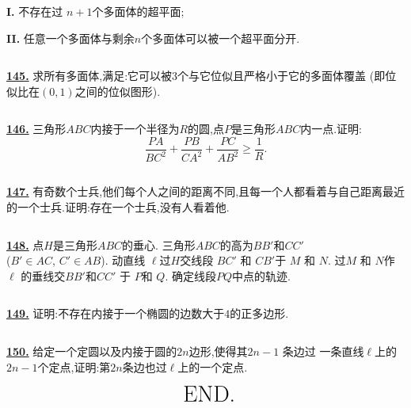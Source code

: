 \documentclass{article}
\newcommand{\plus}{+}
\begin{document}
{\bf I.} 不存在过  $n+1$个多面体的超平面;

{\bf II.} 任意一个多面体与剩余$n$个多面体可以被一个超平面分开.


$$ $$


\href{ http://www.artofproblemsolving.com/Forum/viewtopic.php?p=475049#p475049
}{\bf 145.} 求所有多面体,满足:它可以被$3$个与它位似且严格小于它的多面体覆盖 (即位似比在$(0,1)$之间的位似图形).


$$ $$


\href{ http://www.artofproblemsolving.com/Forum/viewtopic.php?p=20670#p20670 }{\bf 146.} 三角形$ ABC$内接于一个半径为$ R$的圆,点$ P$是三角形$ ABC$内一点.证明:
$$\frac {PA}{BC^{2}} \plus{} \frac {PB}{CA^{2}} \plus{} \frac {PC}{AB^{2}}\ge \frac {1}{R}.$$

$$ $$


\href{ http://www.artofproblemsolving.com/Forum/viewtopic.php?p=773#p773}{\bf 147.}  有奇数个士兵,他们每个人之间的距离不同,且每一个人都看着与自己距离最近的一个士兵.证明:存在一个士兵,没有人看着他.

$$ $$


\href{ http://www.artofproblemsolving.com/Forum/viewtopic.php?p=181685#p181685}{\bf 148.} 点$H$是三角形$ABC$的垂心. 三角形$ABC$的高为$BB'$和$CC'$\\($B' \in AC$, $C' \in AB$). 动直线 $\ell$过$H$交线段 $BC'$ 和 $CB'$于 $M$ 和 $N$.  过$M$ 和 $N$作$\ell$ 的垂线交$BB'$和$CC'$ 于 $P$和 $Q$. 确定线段$ PQ$中点的轨迹.

$$ $$


\href{http://www.artofproblemsolving.com/Forum/viewtopic.php?p=117715#p117715 }{\bf 149.} 证明:不存在内接于一个椭圆的边数大于$4$的正多边形.

$$ $$


\href{http://www.artofproblemsolving.com/Forum/viewtopic.php?p=117345#p117345 }{\bf 150.} 给定一个定圆以及内接于圆的$2n$边形,使得其$2n-1$ 条边过 一条直线$\ell$上的$2n-1$个定点,证明:第$2n$条边也过$\ell$上的一个定点.


$$ \huge \text{ END.}$$
\end{document}
